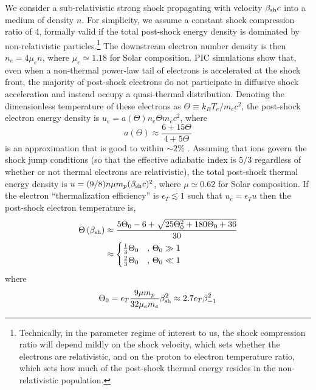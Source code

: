 \documentclass[twocolumn]{aastex63}
\begin{document}
We consider a sub-relativistic strong shock propagating with velocity $\beta_{\rm sh} c$ into a medium of density $n$.  For simplicity, we assume a constant shock compression ratio of $4$, formally valid  if the total post-shock energy density is dominated by non-relativistic particles.\footnote{Technically, in the parameter regime of interest to us, the shock compression ratio will depend mildly on the shock velocity, which sets whether the electrons are relativistic, and on the proton to electron temperature ratio, which sets how much of the post-shock thermal energy resides in the non-relativistic population.}  The downstream electron number density is then $n_e = 4\mu_e n$, where $\mu_e \simeq 1.18$ for Solar composition. 
PIC simulations show that, even when a non-thermal power-law tail of electrons is accelerated at the shock front, the majority of post-shock electrons do not participate in diffusive shock acceleration and instead occupy a quasi-thermal distribution.
Denoting the dimensionless temperature of these electrons as $\Theta \equiv k_B T_e / m_e c^2$, the post-shock electron energy density is
$u_e = a\left(\Theta\right) n_e \Theta m_e c^2$, where
\begin{equation}
    a\left(\Theta\right) \approx \frac{6+15\Theta}{4+5\Theta}
\end{equation}
is an approximation that is good to within $\sim 2\%$ \citep{Gammie&Popham98,Ozel+00}.
Assuming that ions govern the shock jump conditions (so that the effective adiabatic index is $5/3$ regardless of whether or not thermal electrons are relativistic), the total post-shock thermal energy density is 
$u = (9/8) n \mu m_p (\beta_{\rm sh}c)^2$, where $\mu \simeq 0.62$ for Solar composition.
If the electron ``thermalization efficiency'' is $\epsilon_T \lesssim 1$ such that $u_e = \epsilon_T u$ \citep{Margalit+21} then the post-shock electron temperature is,
\begin{align}
\label{eq:Theta}
    \Theta\left(\beta_{\rm sh}\right) 
    &\approx 
    \frac{ 5\Theta_0 - 6 + \sqrt{ 25\Theta_0^2 + 180\Theta_0 + 36 } }{30}
    \nonumber \\
    &\approx 
    \begin{cases}
    \frac{1}{3}\Theta_0 &,\, \Theta_0 \gg 1
    \\
    \frac{2}{3}\Theta_0 &,\, \Theta_0 \ll 1
    \end{cases}
\end{align}
where
\begin{equation}
\label{eq:Theta_0}
    \Theta_0 = \epsilon_T \frac{9\mu m_p}{32\mu_e m_e} \beta_{\rm sh}^2
    \approx 2.7 \epsilon_T \beta_{-1}^2
\end{equation}
\end{document}
